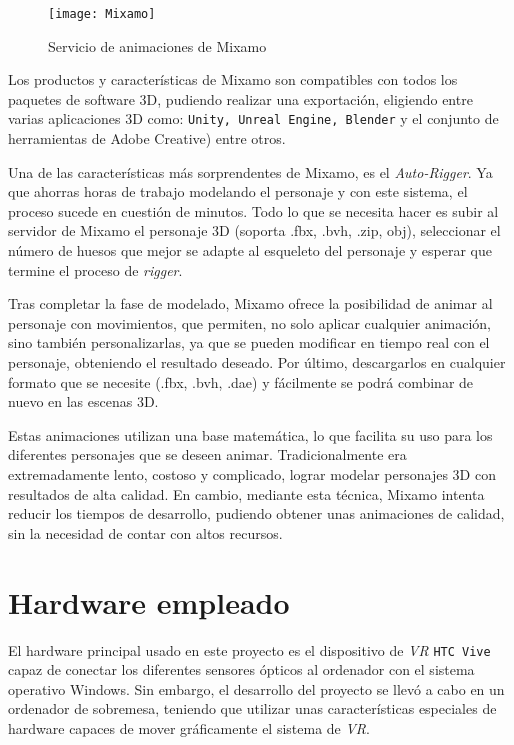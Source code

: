 \begin{figure}[h]
    \centering 
    \texttt{[image: Mixamo]}
    \caption{Servicio de animaciones de Mixamo}
    \label{fig:Mixamo} 
\end{figure} 

Los productos y características de Mixamo son compatibles con todos los paquetes de software 3D, pudiendo realizar una exportación, eligiendo entre varias aplicaciones 3D como: \texttt{Unity, Unreal Engine, Blender} y el conjunto de herramientas de Adobe Creative) entre otros.

Una de las características más sorprendentes de Mixamo, es el \textit{Auto-Rigger}. Ya que ahorras horas de trabajo modelando el personaje y con este sistema, el proceso sucede en cuestión de minutos. Todo lo que se necesita hacer es subir al servidor de Mixamo el personaje 3D (soporta .fbx, .bvh, .zip, obj), seleccionar el número de huesos que mejor se adapte al esqueleto del personaje y esperar que termine el proceso de \textit{rigger}.

Tras completar la fase de modelado, Mixamo ofrece la posibilidad de animar al personaje con movimientos, que permiten, no solo aplicar cualquier animación, sino también personalizarlas, ya que se pueden modificar en tiempo real con el personaje, obteniendo el resultado deseado. Por último, descargarlos en cualquier formato que se necesite (.fbx, .bvh, .dae) y fácilmente se podrá combinar de nuevo en las escenas 3D.

Estas animaciones utilizan una base matemática, lo que facilita su uso para los diferentes personajes que se deseen animar. Tradicionalmente era extremadamente lento, costoso y complicado, lograr modelar personajes 3D con resultados de alta calidad. En cambio, mediante esta técnica, Mixamo intenta reducir los tiempos de desarrollo, pudiendo obtener unas animaciones de calidad, sin la necesidad de contar con altos recursos. 

\section{Hardware empleado}
\label{cap4:sec:hardware empleado}

El hardware principal usado en este proyecto es el dispositivo de \textit{VR} \texttt{HTC Vive} capaz de conectar los diferentes sensores ópticos al ordenador con el sistema operativo Windows. Sin embargo, el desarrollo del proyecto se llevó a cabo en un ordenador de sobremesa, teniendo que utilizar unas características especiales de hardware capaces de mover gráficamente el sistema de \textit{VR}.

